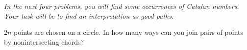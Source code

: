 \emph{In the next four problems, you will find some occurrences of Catalan numbers. Your task will be to find an interpretation as good paths.}

$2n$ points are chosen on a circle. In how many ways can you join pairs of points by nonintersecting chords?
